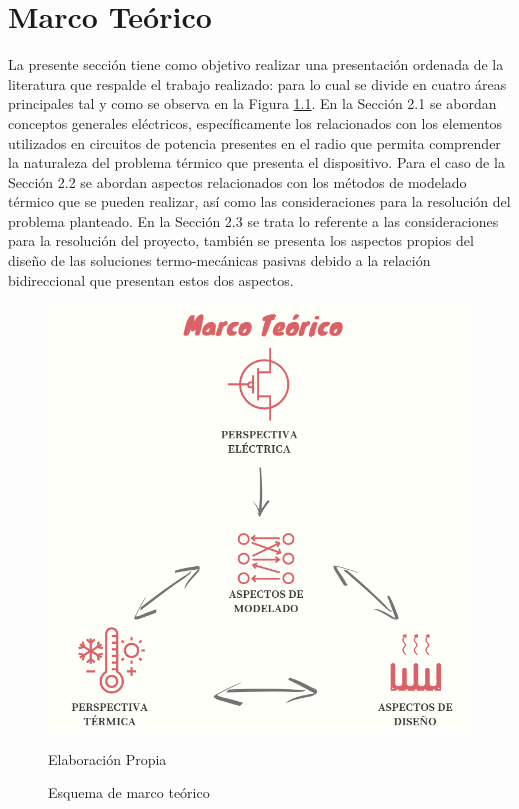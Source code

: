 \chapter{Marco Teórico}

La presente sección tiene como objetivo realizar una presentación ordenada de la literatura que respalde el trabajo realizado: para lo cual se divide en cuatro áreas principales tal y como se observa en la Figura \ref{marco}. En la Sección 2.1 se abordan conceptos generales eléctricos, específicamente los relacionados con los elementos utilizados en circuitos de potencia presentes en el radio que permita comprender la naturaleza del problema térmico que presenta el dispositivo. Para el caso de la Sección 2.2 se abordan aspectos relacionados con los métodos de modelado térmico que se pueden realizar, así como las consideraciones para la resolución del problema planteado. En la Sección 2.3 se trata lo referente a las consideraciones para la resolución del proyecto, también se presenta los aspectos propios del diseño de las soluciones termo-mecánicas pasivas debido a la relación bidireccional que presentan estos dos aspectos. 

\begin{figure}[H]
\centering
\includegraphics[scale=0.45]{Figuras/Marco_teorico.png}
\caption{Esquema de marco teórico}
Elaboración Propia
\label{marco}
\end{figure}


